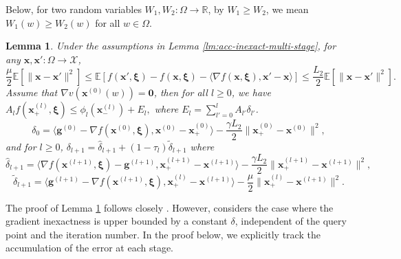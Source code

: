 \documentclass[11pt,fullpage,letterpaper]{article}
\newcommand{\mc}{\mathcal}
\newcommand{\mb}{\mathbf}
\newcommand{\R}{\mathbb{R}}
\newcommand{\E}{\mathbb{E}}
\newcommand{\bx}{\boldsymbol{\xi}}
\newtheorem{lemma}{Lemma}[section]
\begin{document}
Below, for two random variables $W_1,W_2:\Omega\to \R$, by $W_1\geq W_2$, we mean $W_1(w)\geq W_2(w)$ for all $w\in \Omega$. 

\begin{lemma}\label{lm:general_inexact}
Under the assumptions in Lemma \ref{lm:acc-inexact-multi-stage}, for any $
\mb x,\mb x':\Omega\to \mc X$, 
\begin{equation}\label{eq:condition-convex-smooth}
    \frac{\mu}{2}\E[\|\mb x - \mb x'\|^2]\leq \E[f(\mb x',\bx) - f(\mb x,\bx) - \langle \nabla f(\mb x,\bx),\mb x'-\mb x\rangle] \leq \frac{L_2}{2}\E[\|\mb x -\mb x'\|^2]. 
\end{equation}
Assume that $\nabla v(\mb x^{(0)}(w)) = \mb 0$, then for all $l\geq 0$, we have $A_lf(\mb x_+^{(l)},\bx)\leq \phi_l(\mb x_-^{(l)})  + E_l,$
where $E_l = \sum_{l'=0}^l A_{l'}\delta_{l'} $. 
\begin{displaymath}
    \delta_0 =\langle \mb g^{(0)} - \nabla f(\mb x^{(0)},\bx),\mb x^{(0)}-\mb x_+^{(0)}\rangle - \frac{\gamma L_2}{2}\|\mb x_+^{(0)}- \mb x^{(0)}\|^2,
\end{displaymath}
and for $l\geq 0$, $\delta_{l+1} = \hat{\delta}_{l+1} + (1-\tau_l) \tilde{\delta}_{l+1}$ where
\begin{displaymath}
    \hat{\delta}_{l+1} = \langle \nabla f(\mb x^{(l+1)},\bx)- \mb g^{(l+1)},\mb x_+^{(l+1)}-\mb x^{(l+1)}\rangle-\frac{\gamma L_2}{2}\|\mb x_+^{(l+1)}-\mb x^{(l+1)}\|^2,
\end{displaymath}
\begin{displaymath}
    \tilde{\delta}_{l+1} = \langle \mb g^{(l+1)} - \nabla f(\mb x^{(l+1)},\bx) ,\mb x_+^{(l)}-\mb x^{(l+1)}\rangle-\frac{\mu}{2}\|\mb x_+^{(l)} - \mb x^{(l+1)}\|^2.
\end{displaymath}
\end{lemma}
The proof of Lemma \ref{lm:general_inexact} follows closely \cite{DEVOLDER2013_strong}. However, \cite{DEVOLDER2013_strong} considers the case where the gradient inexactness is upper bounded by a constant $\delta$, independent of the query point and the iteration number. In the proof below, we explicitly track the accumulation of the error at each stage.
\end{document}
